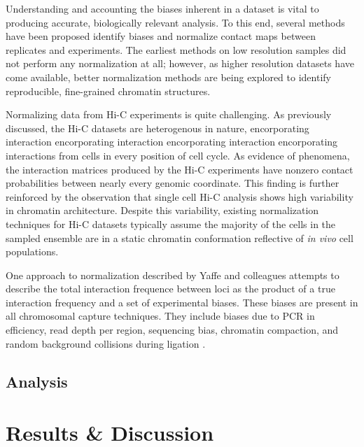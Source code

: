 \documentclass[phd,tocprelim]{cornell}
\begin{document}
Understanding and accounting the biases inherent in a dataset is vital to
producing accurate, biologically relevant analysis.  To this end, several methods
have been proposed identify biases and normalize contact maps between replicates
and experiments\cite{yaffe2011}\cite{hu2012}\cite{yang2014}.  The earliest methods on low
resolution samples did not perform any normalization at all\cite{aiden2009};
however, as higher resolution datasets have come available, better
normalization methods are being explored to identify reproducible,
fine-grained chromatin structures.

Normalizing data from Hi-C experiments is quite challenging.  As previously
discussed, the Hi-C datasets are heterogenous in nature, encorporating interaction encorporating interaction encorporating interaction encorporating
interactions from cells in every position of cell cycle.  As evidence of phenomena,
the interaction matrices produced by the Hi-C experiments have nonzero contact
probabilities between nearly every genomic coordinate\cite{dekker2013}.  This
finding is further reinforced by the observation that single cell Hi-C analysis
shows high variability in chromatin architecture\cite{nagano2013}.  Despite this
variability, existing normalization techniques for Hi-C datasets typically
assume the majority of the cells in the sampled ensemble are in a static
chromatin conformation reflective of \textit{in vivo} cell populations.

One approach to normalization described by Yaffe and colleagues\cite{yaffe2011}
attempts to describe the total interaction frequence between loci as the product
of a true interaction frequency and a set of experimental biases.  These biases
are present in all chromosomal capture techniques.  They include biases due to
PCR in efficiency, read depth per region, sequencing bias, chromatin compaction,
and random background collisions during
ligation\cite{benner2014} \cite{dekker2006}.




\section{Analysis}






\chapter{Results \& Discussion}
\end{document}
